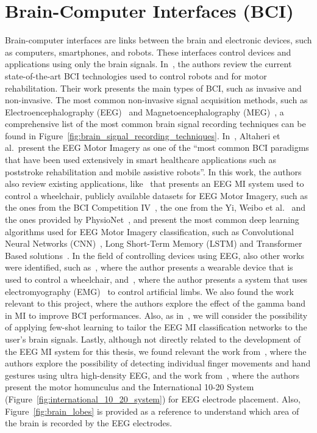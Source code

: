 \section{Brain-Computer Interfaces (BCI)}
Brain-computer interfaces are links between the brain and electronic devices, such as computers, smartphones, and robots.
These interfaces control devices and applications using only the brain signals.
In~\cite{robinson2021emerging}, the authors review the current state-of-the-art BCI technologies used to control robots and for motor rehabilitation.
Their work presents the main types of BCI, such as invasive and non-invasive. The most common non-invasive signal acquisition methods, such as Electroencephalography (EEG)~\cite{niedermeyer2005electroencephalography} and Magnetoencephalography (MEG)~\cite{singh2014magnetoencephalography}, a comprehensive list of the most common brain signal recording techniques can be found in Figure~\ref{fig:brain_signal_recording_techniques}.
In~\cite{altaheri_deep_2023}, Altaheri et al.\ present the EEG Motor Imagery as one of the ``most common BCI paradigms that have been used extensively in smart healthcare applications such as poststroke rehabilitation and mobile assistive robots''.
In this work, the authors also review existing applications, like~\cite{tang2020motor} that presents an EEG MI system used to control a wheelchair, publicly available datasets for EEG Motor Imagery, such as the ones from the BCI Competition IV~\cite{tangermann2012review}, the one from the Yi, Weibo et al.~\cite{yi2014evaluation} and the ones provided by PhysioNet~\cite{goldberger2000physiobank, schalk2004bci2000}, and present the most common deep learning algorithms used for EEG Motor Imagery classification, such as Convolutional Neural Networks (CNN)~\cite{lawhern2018eegnet}, Long Short-Term Memory (LSTM) and Transformer Based solutions~\cite{sharma_deep_2023}.
In the field of controlling devices using EEG, also other works were identified, such as~\cite{10471624}, where the author presents a wearable device that is used to control a wheelchair, and~\cite{10453986}, where the author presents a system that uses electromyography (EMG)~\cite{mills2005basics} to control artificial limbs.
We also found the work~\cite{ahn2013gamma} relevant to this project, where the authors explore the effect of the gamma band in MI to improve BCI performances.
Also, as in~\cite{mammone2023few}, we will consider the possibility of applying few-shot learning to tailor the EEG MI classification networks to the user's brain signals.
Lastly, although not directly related to the development of the EEG MI system for this thesis, we found relevant the work from~\cite{10123901, lee2022individual}, where the authors explore the possibility of detecting individual finger movements and hand gestures using ultra high-density EEG, and the work from~\cite{penfield1950cerebral, jasper1958ten}, where the authors present the motor homunculus and the International 10-20 System (Figure~\ref{fig:international_10_20_system}) for EEG electrode placement.
Also, Figure~\ref{fig:brain_lobes} is provided as a reference to understand which area of the brain is recorded by the EEG electrodes.

